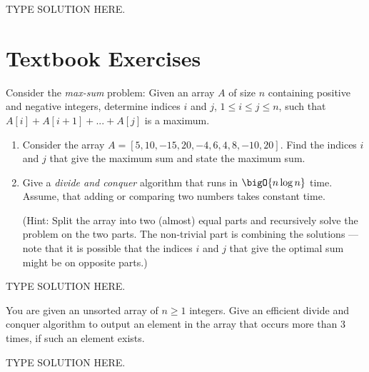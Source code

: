 \documentclass[final]{article}
\begin{document}
\begin{solution}
    TYPE SOLUTION HERE.
\end{solution}

\section{Textbook Exercises}
\begin{exercise}{5.18}
    Consider the \emph{max-sum} problem: Given an array $A$ of size $n$ containing positive and negative integers, determine indices $i$ and $j$, $1 \leq i \leq j \leq n$, such that $A[i] + A[i+1] + ... + A[j]$ is a maximum.
    \begin{enumerate}[label=(\alph*)]
        \item Consider the array $A = [5, 10, -15, 20, -4, 6, 4, 8, -10, 20]$. Find the indices $i$ and $j$ that give the maximum sum and state the maximum sum.
        \item Give a \emph{divide and conquer} algorithm that runs in  $\bigO{n\log{n}}$ time. Assume, that adding or comparing two numbers takes constant time.

              (Hint: Split the array into two (almost) equal parts and recursively solve the problem on the two parts. The non-trivial part is combining the solutions --- note that it is possible that the indices $i$ and $j$ that give the optimal sum might be on opposite parts.)
    \end{enumerate}
\end{exercise}

\begin{solution}
    TYPE SOLUTION HERE.
\end{solution}

\begin{exercise}{5.23}
    You are given an unsorted array of $n \geq 1$ integers. Give an efficient divide and conquer algorithm to output an element in the array that occurs more than 3 times, if such an element exists.
\end{exercise}

\begin{solution}
    TYPE SOLUTION HERE.
\end{solution}
\end{document}
